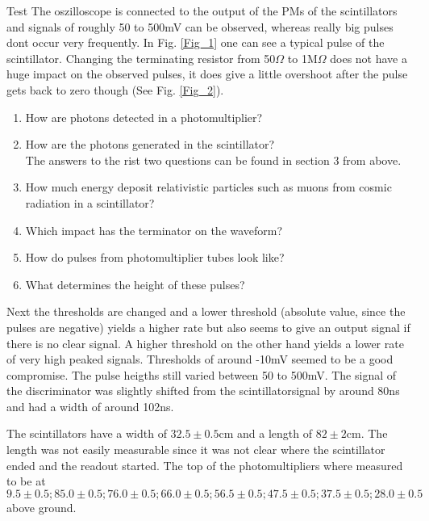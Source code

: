 Test
The oszilloscope is connected to the output of the PMs of the scintillators and signals of roughly 50 to 500mV can be observed, whereas really big pulses dont occur very frequently. In Fig. \ref{Fig_1} one can see a typical pulse of the scintillator. Changing the terminating resistor from 50$\Omega$ to 1M$\Omega$ does not have a huge impact on the observed pulses, it does give a little overshoot after the pulse gets back to zero though (See Fig. \ref{Fig_2}). 

\begin{enumerate}
\item How are photons detected in a photomultiplier?\\
\item How are the photons generated in the scintillator?\\
The answers to the rist two questions can be found in section 3 from above.
\item How much energy deposit relativistic particles such as muons from cosmic radiation in a scintillator?\\

\item Which impact has the terminator on the waveform?\\
\item How do pulses from photomultiplier tubes look like?\\
\item What determines the height of these pulses?\\
\end{enumerate}

Next the thresholds are changed and a lower threshold (absolute value, since the pulses are negative) yields a higher rate but also seems to give an output signal if there is no clear signal. A higher threshold on the other hand yields a lower rate of very high peaked signals. Thresholds of around -10mV seemed to be a good compromise. The pulse heigths still varied between 50 to 500mV. The signal of the discriminator was slightly shifted from the scintillatorsignal by around 80ns and had a width of around 102ns. 

The scintillators have a width of $32.5\pm0.5$cm and a length of $82\pm2$cm. The length was not easily measurable since it was not clear where the scintillator ended and the readout started. The top of the photomultipliers where measured to be at $9.5 \pm 0.5; 85.0 \pm 0.5; 76.0 \pm 0.5; 66.0 \pm 0.5; 56.5 \pm 0.5; 47.5 \pm 0.5; 37.5 \pm 0.5; 28.0 \pm 0.5$ above ground. 


